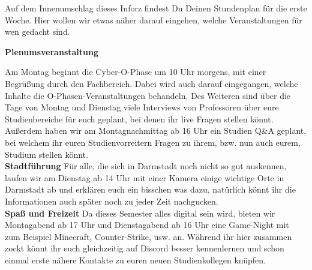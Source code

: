 {Auf dem Innenumschlag dieses Inforz findest Du Deinen Stundenplan für die erste Woche. Hier wollen wir etwas näher darauf eingehen, welche Veranstaltungen für wen gedacht sind.}
{\textbf{Plenumsveranstaltung}

    Am Montag beginnt die Cyber-O-Phase um 10 Uhr morgens, mit einer Begrüßung durch den Fachbereich. Dabei wird auch darauf eingegangen, welche Inhalte die O-Phasen-Veranstaltungen behandeln. Des Weiteren sind über die Tage von Montag und Dienstag viele Interviews von Professoren über eure Studienbereiche für euch geplant, bei denen ihr live Fragen stellen könnt.  Außerdem haben wir am Montagnachmittag ab 16 Uhr ein Studien Q\&A geplant, bei welchem ihr euren Studienvorreitern Fragen zu ihrem, bzw. nun auch eurem, Studium stellen könnt. \\

    \textbf{Stadtführung}
    Für alle, die sich in Darmstadt noch nicht so gut auskennen, laufen wir am Dienstag ab 14 Uhr mit einer Kamera einige wichtige Orte in Darmstadt ab und erklären euch ein bisschen was dazu, natürlich könnt ihr die Informationen auch später noch zu jeder Zeit nachgucken.\\

    \textbf{Spaß und Freizeit}
    Da dieses Semester alles digital sein wird, bieten wir Montagabend ab 17 Uhr und Dienstagabend ab 16 Uhr eine Game-Night mit zum Beispiel Minecraft, Counter-Strike, usw. an. Während ihr hier zusammen zockt könnt ihr euch gleichzeitig auf Discord besser kennenlernen und schon einmal erste nähere Kontakte zu euren neuen Studienkollegen knüpfen.
}{}
